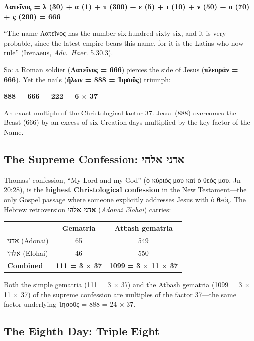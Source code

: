 \documentclass[12pt,a4paper]{article}
\begin{document}
\begin{center}
\textbf{Λατεῖνος = λ (30) + α (1) + τ (300) + ε (5) + ι (10) + ν (50) + ο (70) + ς (200) = 666}
\end{center}

``The name Λατεῖνος has the number six hundred sixty-six, and it is very probable, since the latest empire bears this name, for it is the Latins who now rule'' (Irenaeus, \textit{Adv.\ Haer.} 5.30.3).

So: a Roman soldier (\textbf{Λατεῖνος = 666}) pierces the side of Jesus (\textbf{πλευράν = 666}). Yet the nails (\textbf{ἥλων = 888 = Ἰησοῦς}) triumph:

\begin{center}
\textbf{888 − 666 = 222 = 6 $\times$ 37}
\end{center}

An exact multiple of the Christological factor 37. Jesus (888) overcomes the Beast (666) by an excess of six Creation-days multiplied by the key factor of the Name.

\subsection{The Supreme Confession: אדני אלהי}

Thomas' confession, ``My Lord and my God'' (ὁ κύριός μου καὶ ὁ θεός μου, Jn 20:28), is the \textbf{highest Christological confession} in the New Testament---the only Gospel passage where someone explicitly addresses Jesus with ὁ θεός. The Hebrew retroversion \textbf{אדני אלהי} (\textit{Adonai Elohai}) carries:

\begin{center}
\begin{tabular}{lcc}
\toprule
 & \textbf{Gematria} & \textbf{Atbash gematria} \\
\midrule
אדני (Adonai) & 65 & 549 \\
אלהי (Elohai) & 46 & 550 \\
\textbf{Combined} & \textbf{111 = 3 $\times$ 37} & \textbf{1099 = 3 $\times$ 11 $\times$ 37} \\
\bottomrule
\end{tabular}
\end{center}

Both the simple gematria (111 = 3 $\times$ 37) and the Atbash gematria (1099 = 3 $\times$ 11 $\times$ 37) of the supreme confession are multiples of the factor 37---the same factor underlying Ἰησοῦς = 888 = 24 $\times$ 37.

\subsection{The Eighth Day: Triple Eight}
\end{document}
